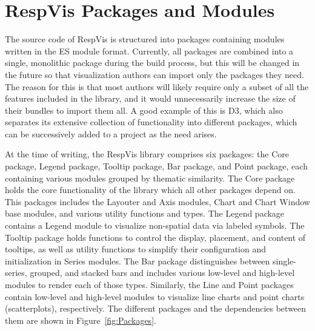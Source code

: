 \chapter{RespVis Packages and Modules}
\label{chap:Packages}

The source code of RespVis is structured into packages containing
modules written in the ES module format. Currently, all packages are
combined into a single, monolithic package during the build process,
but this will be changed in the future so that visualization authors
can import only the packages they need. The reason for this is that
most authors will likely require only a subset of all the features
included in the library, and it would unnecessarily increase the size
of their bundles to import them all. A good example of this is D3,
which also separates its extensive collection of functionality into
different packages, which can be successively added to a project as
the need arises.

At the time of writing, the RespVis library comprises six packages:
the Core package, Legend package, Tooltip package, Bar package, and
Point package, each containing various modules grouped by thematic
similarity. The Core package holds the core functionality of the
library which all other packages depend on. This packages includes the
Layouter and Axis modules, Chart and Chart Window base modules, and
various utility functions and types. The Legend package contains a
Legend module to visualize non-spatial data via labeled symbols. The
Tooltip package holds functions to control the display, placement, and
content of tooltips, as well as utility functions to simplify their
configuration and initialization in Series modules. The Bar package
distinguishes between single-series, grouped, and stacked bars and
includes various low-level and high-level modules to render each of
those types. Similarly, the Line and Point packages contain low-level
and high-level modules to visualize line charts and point charts
(scatterplots), respectively. The different packages and the
dependencies between them are shown in Figure~\ref{fig:Packages}.



